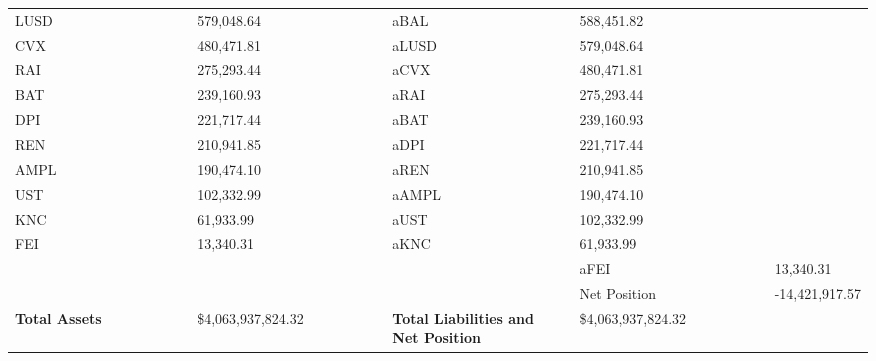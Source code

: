 \begin{longtable}{@{}p{0.25\linewidth}p{0.25\linewidth}p{0.25\linewidth}p{0.25\linewidth}@{}}
LUSD & 579,048.64 & aBAL & 588,451.82 \\
CVX & 480,471.81 & aLUSD & 579,048.64 \\
RAI & 275,293.44 & aCVX & 480,471.81 \\
BAT & 239,160.93 & aRAI & 275,293.44 \\
DPI & 221,717.44 & aBAT & 239,160.93 \\
REN & 210,941.85 & aDPI & 221,717.44 \\
AMPL & 190,474.10 & aREN & 210,941.85 \\
UST & 102,332.99 & aAMPL & 190,474.10 \\
KNC & 61,933.99 & aUST & 102,332.99 \\
FEI & 13,340.31 & aKNC & 61,933.99 \\
 & &  & aFEI & 13,340.31 \\
 & &  & Net Position & -14,421,917.57 \\

\midrule

\textbf{Total Assets} & \$4,063,937,824.32 & \textbf{Total Liabilities and Net Position} & \$4,063,937,824.32 \\

\bottomrule

\end{longtable}
